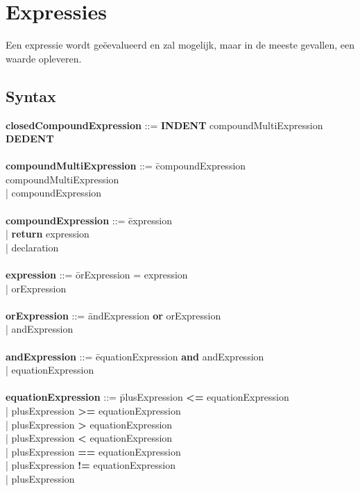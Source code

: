 \section{Expressies}
Een expressie wordt ge\"{e}evalueerd en zal mogelijk, maar in de meeste gevallen, een waarde opleveren.
    \subsection{Syntax}
        \begin{tabbing} 
            {\bf closedCompoundExpression}    ::= \textbf{INDENT} compoundMultiExpression \textbf{DEDENT}\\
            \\ 
            {\bf compoundMultiExpression}     ::= \=compoundExpression compoundMultiExpression\\
                                                  \>| compoundExpression\\
            \\
            {\bf compoundExpression}          ::= \=expression\\
                                                  \>| \textbf{return} expression\\
                                                  \>| declaration\\
            \\ 
            {\bf expression}                  ::= \=orExpression = expression\\
                                                  \>| orExpression\\
            \\   
            {\bf orExpression}                ::= \=andExpression \textbf{or} orExpression\\
                                                  \>| andExpression\\
            \\   
            {\bf andExpression}               ::= \=equationExpression \textbf{and} andExpression\\
                                                  \>| equationExpression\\
            \\ 
            {\bf equationExpression}          ::= \=plusExpression \textbf{\textless{}=} equationExpression\\
                                                  \>| plusExpression \textbf{\textgreater{}=} equationExpression\\
                                                  \>| plusExpression \textbf{\textgreater{}} equationExpression\\
                                                  \>| plusExpression \textbf{\textless{}} equationExpression\\
                                                  \>| plusExpression \textbf{==} equationExpression\\
                                                  \>| plusExpression \textbf{!=} equationExpression\\
                                                  \>| plusExpression\\


\end{tabbing}
